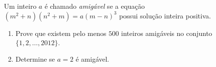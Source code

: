 Um inteiro $a$ é chamado \emph{amigável} se a equação $(m^2+n)(n^2+m)=a(m-n)^3$ possui solução inteira positiva.

\begin{enumerate}[label = (\alph*)]
	\item  Prove que existem pelo menos $500$ inteiros amigáveis no conjunto $\{ 1,2,\ldots ,2012\}$.

	\item  Determine se $a=2$ é amigável.
 \end{enumerate}
